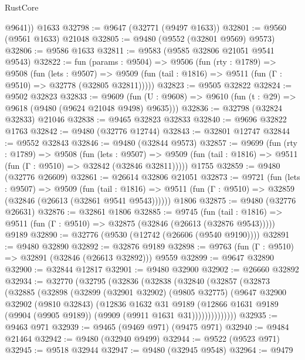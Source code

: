 \begin{lexlean}{RustCore}
\begin{coremodule}
        @9641))
    @1633
@32798 := @9647 (@32771 (@9497 @1633))
@32801 := @9560 (@9561 @1633) @21048
@32805 := @9480 (@9552 (@32801 @9569) @9573)
@32806 := @9586 @1633
@32811 := @9583 (@9585 @32806 @21051 @9541 @9543)
@32822 := fun (params : @9504) =>
  @9506
    (fun (rty : @1789) =>
    @9508
      (fun (lets : @9507) =>
      @9509 (fun (tail : @1816) => @9511 (fun (Γ : @9510) => @32778 (@32805 @32811)))))
@32823 := @9505 @32822
@32824 := @9502 @32823
@32833 := @9609
    (fun (U : @9608) => @9610 (fun (t : @29) => @9618 (@9480 (@9624 @21048 @9498) @9635)))
@32836 := @32798 (@32824 @32833) @21046
@32838 := @9465 @32823 @32833
@32840 := @9696 @32822 @1763
@32842 := @9480 (@32776 @12744)
@32843 := @32801 @12747
@32844 := @9552 @32843
@32846 := @9480 (@32844 @9573)
@32857 := @9699
    (fun (rty : @1789) =>
    @9508
      (fun (lets : @9507) =>
      @9509 (fun (tail : @1816) => @9511 (fun (Γ : @9510) => @32842 (@32846 @32811)))))
    @1755
@32859 := @9480 (@32776 @26609)
@32861 := @26614 @32806 @21051
@32873 := @9721
    (fun (lets : @9507) =>
    @9509
      (fun (tail : @1816) =>
      @9511 (fun (Γ : @9510) => @32859 (@32846 (@26613 (@32861 @9541 @9543))))))
    @1806
@32875 := @9480 (@32776 @26631)
@32876 := @32861 @1806
@32885 := @9745
    (fun (tail : @1816) => @9511 (fun (Γ : @9510) => @32875 (@32846 (@26613 (@32876 @9543)))))
    @9189
@32890 := @32776 (@9530 (@12742 (@26606 (@9540 @9190))))
@32891 := @9480 @32890
@32892 := @32876 @9189
@32898 := @9763 (fun (Γ : @9510) => @32891 (@32846 (@26613 @32892))) @9559
@32899 := @9647 @32890
@32900 := @32844 @12817
@32901 := @9480 @32900
@32902 := @26660 @32892
@32934 := @32770
    (@32795
      (@32836
        (@32838
          (@32840
            (@32857
              (@32873
                (@32885
                  (@32898
                    (@32899
                      (@32901 @32902)
                      (@9805 @32775)
                      (@9647
                        @32900
                        @32902
                        (@9810 @32843)
                        (@12836
                          @1632
                          @31
                          @9189
                          (@12866
                            @1631
                            @9189
                            (@9904 (@9905 @9189))
                            (@9909 (@9911 @1631 @31))))))))))))))
@32935 := @9463 @971
@32939 := @9465 (@9469 @971) (@9475 @971)
@32940 := @9484 @21464
@32942 := @9480 (@32940 @9499)
@32944 := @9522 (@9523 @971)
@32945 := @9518 @32944
@32947 := @9480 (@32945 @9548)
@32964 := @9479

\end{coremodule}
\end{lexlean}

